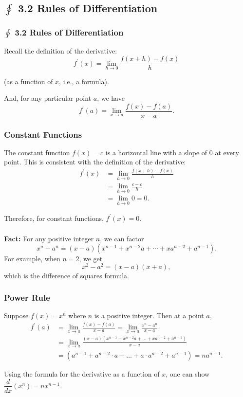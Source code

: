 \documentclass[14pt]{beamer}
\begin{document}
\begin{frame}
\subsection[3.2 Rules of Differentiation]{$\oint$ 3.2 Rules of Differentiation}
\frametitle{$\oint$ 3.2 Rules of Differentiation}
\small
Recall the definition of the derivative:
\vspace{-0.25pc}
\[f^{\prime}(x)=\lim_{h \to 0} \frac{f(x+h)-f(x)}{h}\]

\vspace{-0.25pc}
(as a function of $x$, i.e., a formula).

\vspace{1pc}
And, for any particular point $a$, we have 
\vspace{-0.25pc}
\[f^{\prime}(a)=\lim_{x \to a} \frac{f(x)-f(a)}{x-a}.\]
\end{frame}

\begin{frame}
\frametitle{Constant Functions}
\small
The constant function $f(x)=c$ is a horizontal line with a slope of 0 at every point.  This is consistent with the definition of the derivative:
\begin{align*}
f^{\prime}(x)&=\lim_{h \to 0} \frac{f(x+h)-f(x)}{h} \\
 &=\lim_{h \to 0} \frac{c-c}{h} \\[0.5pc]
 &=\lim_{h \to 0} 0 = 0.
\end{align*}

Therefore, for constant functions, $f^{\prime}(x)=0.$
\end{frame}

\begin{frame}
\frametitle{}
{\bf Fact:} For any positive integer $n$, we can factor
\[x^n-a^n=(x-a)(x^{n-1}+x^{n-2}a+\cdots+xa^{n-2}+a^{n-1}).\]
For example, when $n=2$, we get
\[x^2-a^2=(x-a)(x+a),\]
which is the difference of squares formula.
\end{frame}

\begin{frame}
\frametitle{Power Rule}
\small
Suppose $f(x)=x^n$ where $n$ is a positive integer.  Then at a point $a$,
\begin{align*}
f^{\prime}(a) &= \lim_{x \to a} \frac{f(x)-f(a)}{x-a} = \lim_{x \to a} \frac{x^n - a^n}{x-a} \\[0.25pc]
&= \lim_{x \to a} \frac{(x-a)(x^{n-1}+x^{n-2}a + \dots + xa^{n-2}+a^{n-1})}{x-a} \\[0.25pc]
&= (a^{n-1}+a^{n-2}\cdot a + \dots + a \cdot a^{n-2} + a^{n-1}) = n a^{n-1}. 
\end{align*}

Using the formula for the derivative as a function of $x$, one can show $\dfrac{d}{dx} (x^n)= nx^{n-1}.$
\end{frame}
\end{document}
